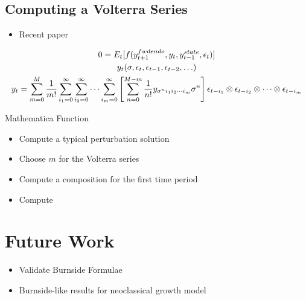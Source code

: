 \documentclass[12pt]{article}
\begin{document}
\subsection{Computing a Volterra Series}


{

  \begin{itemize}
  \item Recent paper\cite{meyer-gohde10,lan13} 
  \end{itemize}
    \begin{gather*}
0=E_t [ f(y_{t+1}^{fwdendo},y_t,y_{t-1}^{state},\epsilon_t)]\\
y_t(\sigma,\epsilon_{t},\epsilon_{t-1},\epsilon_{t-2},\ldots)\\
      y_t= \sum_{m=0}^M\frac{1}{m!} \sum_{i_1=0}^\infty\sum_{i_2=0}^\infty\cdots\sum_{i_m=0}^\infty\left [ \sum_{n=0}^{M-m} \frac{1}{n!} y_{\sigma^n i_1 i_2\cdots i_m}\sigma^n\right ] \epsilon_{t-i_1}\otimes \epsilon_{t-i_2} \otimes \cdots \otimes \epsilon_{t-i_m}
    \end{gather*}
}


{Mathematica Function}
   \begin{itemize}
   \item Compute a typical perturbation solution
   \item Choose $m$ for the Volterra series
   \item Compute a composition for the first time period
   \item Compute 
   \end{itemize}



\section{Future Work}
\label{sec:future-work}

\begin{itemize}
\item Validate Burnside Formulae
\item Burnside-like results for neoclassical growth model
\end{itemize}


\end{document}
